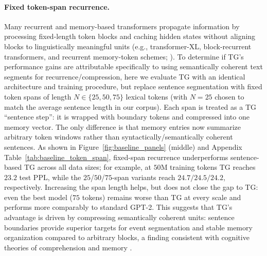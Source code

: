 \documentclass{article}
\begin{document}
\paragraph{Fixed token-span recurrence.}
Many recurrent and memory-based transformers propagate information by processing fixed-length token blocks and caching hidden states without aligning blocks to linguistically meaningful units (e.g., transformer-XL, block-recurrent transformers, and recurrent memory-token schemes; \citep{dai2019transformerxl,hutchins2022blockrecurrent,wu2022memorizing}). 
To determine if TG's performance gains are attributable specifically to using semantically coherent text segments for recurrence/compression, here we evaluate TG with an identical architecture and training procedure, but replace sentence segmentation with fixed token spans of length $N\in\{25,50,75\}$ lexical tokens (with $N{=}25$ chosen to match the average sentence length in our corpus). Each span is treated as a TG “sentence step”: it is wrapped with boundary tokens and compressed into one memory vector. The only difference is that memory entries now summarize arbitrary token windows rather than syntactically/semantically coherent sentences. As shown in Figure~\ref{fig:baseline_panels} (middle) and Appendix Table~\ref{tab:baseline_token_span}, fixed-span recurrence underperforms sentence-based TG across all data sizes; for example, at $50$M training tokens TG reaches $23.2$ test PPL, while the $25$/$50$/$75$-span variants reach $24.7/24.5/24.2$, respectively. Increasing the span length helps, but does not close the gap to TG: even the best model ($75$ tokens) remains worse than TG at every scale and performs more comparably to standard GPT-2. This suggests that TG’s advantage is driven by compressing semantically coherent units: sentence boundaries provide superior targets for event segmentation and stable memory organization compared to arbitrary blocks, a finding consistent with cognitive theories of comprehension and memory \citep{radvansky2011event,jarvella1971syntactic,zwaan1998situation}.
\end{document}

